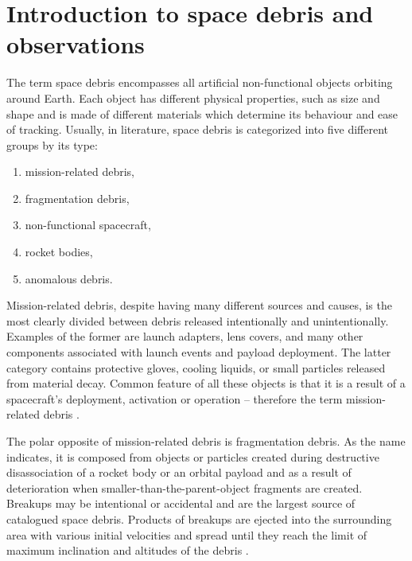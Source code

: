 \chapter{Introduction to space debris and observations}\label{chap:introduction}

	The term space debris encompasses all artificial non-functional objects orbiting around Earth. Each object has different physical properties, such as size and shape and is made of different materials which determine its behaviour and ease of tracking. Usually, in literature, space debris is categorized into five different groups by its type:
	
\begin{enumerate}
	\item mission-related debris,
	\item fragmentation debris,
	\item non-functional spacecraft,
	\item rocket bodies,
	\item anomalous debris.
\end{enumerate}

	Mission-related debris, despite having many different sources and causes, is the most clearly divided between debris released intentionally and unintentionally. Examples of the former are launch adapters, lens covers, and many other components associated with launch events and payload deployment. The latter category contains protective gloves, cooling liquids, or small particles released from material decay. Common feature of all these objects is that it is a result of a spacecraft's deployment, activation or operation -- therefore the term mission-related debris \citep{klinkrad2006space}. 
	
	The polar opposite of mission-related debris is fragmentation debris. As the name indicates, it is composed from objects or particles created during destructive disassociation of a rocket body or an orbital payload and as a result of deterioration when smaller-than-the-parent-object fragments are created. Breakups may be intentional or accidental and are the largest source of catalogued space debris. Products of breakups are ejected into the surrounding area with various initial velocities and spread until they reach the limit of maximum inclination and altitudes of the debris \citep{united1999technical}.
	
